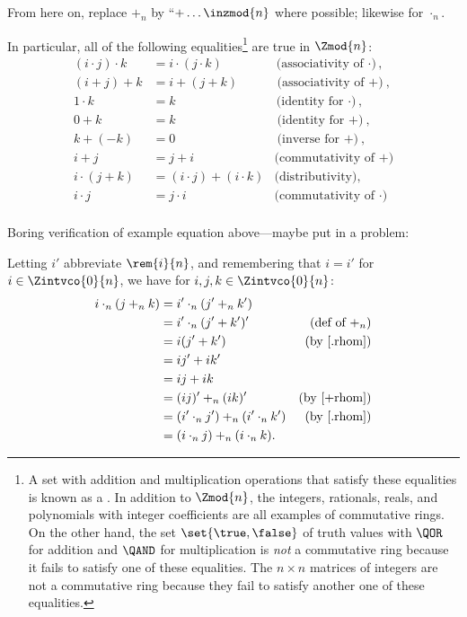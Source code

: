 \begin{editingnotes}
From here on, replace $+_n$ by ``$+ \dots \inzmod{n}$ where
possible; likewise for $\cdot_n$.
\end{editingnotes}

In particular, all of the following equalities\footnote{A set with
  addition and multiplication operations that satisfy these equalities
  is known as a .  In addition to $\Zmod{n}$,
  the integers, rationals, reals, and polynomials with integer
  coefficients are all examples of commutative rings.  On the other
  hand, the set $\set{\true, \false}$ of truth values with $\QOR$ for
  addition and $\QAND$ for multiplication is \emph{not} a commutative
  ring because it fails to satisfy one of these equalities.  The $n
  \times n$ matrices of integers are not a commutative ring because
  they fail to satisfy another one of these equalities.} are true in
$\Zmod{n}$:
\begin{align*}
(i \cdot j) \cdot k & = i \cdot (j \cdot k) 
       & \text{(associativity of $\cdot$)},\\
        (i + j) + k & = i + (j + k)  
       & \text{(associativity of $+$)},\\
           1 \cdot k  & = k  
       & \text{(identity for $\cdot$)},\\
              0 + k  & = k  
       & \text{(identity for $+$)},\\
           k + (-k)  & = 0  
       & \text{(inverse for $+$)},\\
                i + j & = j + i  
       & \text{(commutativity of $+$)}\\
    i \cdot (j + k) & = (i \cdot j) + (i \cdot k)  
       & \text{(distributivity)},\\
            i \cdot j & = j \cdot i  
       & \text{(commutativity of $\cdot$)}\\
\end{align*}

\begin{editingnotes}
Boring verification of example equation above---maybe put in a problem:

Letting $i'$ abbreviate $\rem{i}{n}$, and remembering that $i = i'$
for $i \in \Zintvco{0}{n}$, we have for $i,j,k \in \Zintvco{0}{n}$:
\begin{align*}
i \cdot_n (j +_n k) & = i' \cdot_n (j' +_n k')\\
   & = i' \cdot_n (j' + k')' & \text{(def of $+_n$)}\\
   & = i (j' + k') & \text{(by~\eqref{.rhom})}\\  %
   & = i j' + i k'\\
   & = ij + ik\\
   & = (ij)' +_n (ik)' & \text{(by~\eqref{+rhom})}\\  %
   & = (i' \cdot_ n j') +_n (i' \cdot_ n k') & \text{(by~\eqref{.rhom})}\\
   & = (i \cdot_ n j) +_n (i \cdot_ n k).
\end{align*}
\end{editingnotes}

